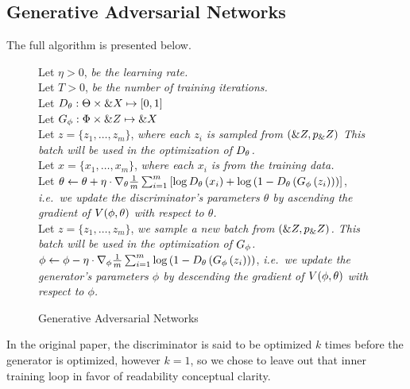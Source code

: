 \subsection{Generative Adversarial Networks}

The full algorithm is presented below.

\begin{figure}[H] \centering
  \begin{minipage}{0.95\linewidth}
    \begin{algorithm}[H]
      Let $\eta > 0$, \textit{be the learning rate.} \\
      Let $T > 0$, \textit{be the number of training iterations.} \\
      Let $D_\theta: \Theta \times \&X \mapsto [0, 1]$ \\
      Let $G_\phi: \Phi \times \&Z \mapsto \&X$ \\
       { Let $z = \{z_1, \dots, z_m\}$, \textit{where
          each $z_i$ is sampled from $(\&Z, p_\&Z)$
          This batch will be used in the optimization of $D_\theta$.} \\
        Let $x = \{x_1, \dots, x_m\}$, \textit{where each $x_i$
          is from the training data.} \\
        Let
        $\theta \gets \theta + \eta \cdot \nabla_{\theta} {1 \over m}
        \sum_{i=1}^m \left[ \log{D_\theta\left( x_i\right)} + \log{\left(1 -
              D_\theta\left(G_\phi\left( z_i\right)\right)\right)} \right]$,
        \textit{i.e.\ we update the discriminator's parameters
          $\theta$ by
          ascending the gradient of $V(\phi, \theta)$ with respect to $\theta$.} \\
        Let $z = \{z_1, \dots, z_m\}$, \textit{we sample a new batch
          from $(\&Z, p_\&Z)$. This batch will be used in the
          optimization
          of $G_\phi$.} \\

        $\phi \gets \phi - \eta \cdot \nabla_{\phi} {1 \over m}
        \sum_{i=1}^m \log{\left(1 -
            D_\theta\left(G_\phi\left(z_i\right)\right)\right)}$, \textit{i.e.\
          we update the generator's parameters $\phi$ by descending
          the gradient of $V(\phi, \theta)$ with respect to $\phi$.} \\ }
    \caption{Generative Adversarial Networks}
    \label{algo:main-algo}
  \end{algorithm}
  \end{minipage}
\end{figure}

In the original paper, the discriminator is said to be optimized $k$
times before the generator is optimized, however $k=1$, so we chose to
leave out that inner training loop in favor of readability conceptual
clarity.

